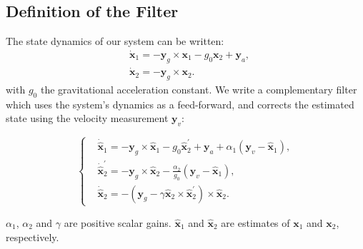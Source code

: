 \documentclass{IJCAS}
\begin{document}
\subsection{Definition of the Filter}
The state dynamics of our system can be written:
\begin{align} 
&\dot{\boldsymbol{x}}_{1} = - \boldsymbol{y}_{g} \times \boldsymbol{x}_{1} - g_{0}\boldsymbol{x}_{2} + \boldsymbol{y}_{a} , \label{eq:x1_dot} \\
&\dot{\boldsymbol{x}}_{2} = - \boldsymbol{y}_{g} \times  \boldsymbol{x}_{2}. \label{eq:x2_dot}
\end{align} 
with $g_{0}$ the gravitational acceleration constant. We write a complementary filter which uses the system's dynamics as a feed-forward, and corrects the estimated state using the velocity measurement $\boldsymbol{y}_{v}$:

\begin{equation}
    \left\{
    \begin{aligned}
        & \dot{\hat{\boldsymbol{x}}}_{1}  = - \boldsymbol{y}_{g} \times \hat{\boldsymbol{x}}_{1} - g_{0} \hat{\boldsymbol{x}}_{2}^{\prime} + \boldsymbol{y}_{a} + \alpha_{1} \left(\boldsymbol{y}_{v} - \hat{\boldsymbol{x}}_{1}\right), \\
    & \dot{\hat{\boldsymbol{x}}}_{2}^{\prime} = -  \boldsymbol{y}_{g} \times \hat{\boldsymbol{x}}_{2} - \frac{\alpha_{2}}{g_{0}} \left(\boldsymbol{y}_{v} - \hat{\boldsymbol{x}}_{1}\right), \\
    & \dot{\hat{\boldsymbol{x}}}_{2} = - \left(\boldsymbol{y}_{g} - \gamma  \hat{\boldsymbol{x}}_{2} \times \hat{\boldsymbol{x}}_{2}^{\prime}\right)\times \hat{\boldsymbol{x}}_{2}.
    \end{aligned}
    \right.
    \label{eq:tilt_dynamics}
\end{equation}


$\alpha_1$, $\alpha_2$ and $\gamma$ are positive scalar gains. $\hat{\boldsymbol{x}}_{1} $ and $\hat{\boldsymbol{x}}_{2} $ are estimates of $\boldsymbol{x}_{1} $ and $\boldsymbol{x}_{2} $, respectively.
\end{document}
